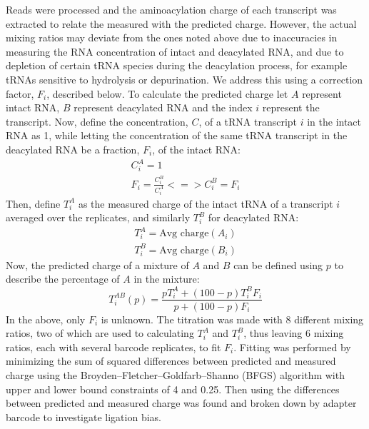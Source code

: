 \documentclass[9pt,lineno]{elife}
\begin{document}
Reads were processed and the aminoacylation charge of each transcript was extracted to relate the measured with the predicted charge.
However, the actual mixing ratios may deviate from the ones noted above due to inaccuracies in measuring the RNA concentration of intact and deacylated RNA, and due to depletion of certain tRNA species during the deacylation process, for example tRNAs sensitive to hydrolysis or depurination.
We address this using a correction factor, $F_i$, described below.
To calculate the predicted charge let $A$ represent intact RNA, $B$ represent deacylated RNA and the index $i$ represent the transcript.
Now, define the concentration, $C$, of a tRNA transcript $i$ in the intact RNA as 1, while letting the concentration of the same tRNA transcript in the deacylated RNA be a fraction, $F_i$, of the intact RNA:
\begin{equation}
\begin{split}
C^A_i = 1 \\
F_i = \frac{C^B_i}{C^A_i} <=> C^B_i = F_i
\end{split}
\end{equation}
Then, define $T^A_i$ as the measured charge of the intact tRNA of a transcript $i$ averaged over the replicates, and similarly $T^B_i$ for deacylated RNA:
\begin{equation}
\begin{split}
T^A_i = \text{Avg charge}(A_i) \\
T^B_i = \text{Avg charge}(B_i)
\end{split}
\end{equation}
Now, the predicted charge of a mixture of $A$ and $B$ can be defined using $p$ to describe the percentage of $A$ in the mixture:
\begin{equation}
\label{eq:pred_charge}
T^{AB}_i(p) = \frac{p T^A_i + (100-p) T^B_i F_i}{p + (100-p) F_i}
\end{equation}
In the above, only $F_i$ is unknown.
The titration was made with 8 different mixing ratios, two of which are used to calculating $T^A_i$ and $T^B_i$, thus leaving 6 mixing ratios, each with several barcode replicates, to fit $F_i$.
Fitting was performed by minimizing the sum of squared differences between predicted and measured charge using the Broyden–Fletcher–Goldfarb–Shanno (BFGS) algorithm with upper and lower bound constraints of 4 and 0.25.
Then using  the differences between predicted and measured charge was found and broken down by adapter barcode to investigate ligation bias.
\end{document}
